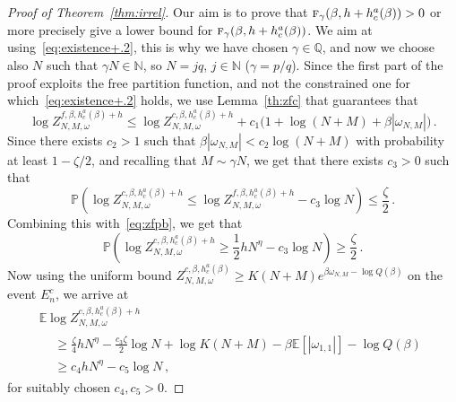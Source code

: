 \documentclass[10pt]{amsart}
\theoremstyle{definition}\newtheorem{defi}[theo]{Definition}\newtheorem{rema}[theo]{Remark}\newtheorem{exam}[theo]{Example}\newtheorem{exem}[theo]{Example}\newtheorem{nota}[theo]{Notation}
\newcommand{\tf}{\textsc{f}} %
\newcommand{\bbE}{\ensuremath{\mathbb{E}}}
\newcommand{\bbN}{\ensuremath{\mathbb{N}}}
\newcommand{\bbP}{\ensuremath{\mathbb{P}}}
\newcommand{\bbQ}{\ensuremath{\mathbb{Q}}}
\begin{document}
\begin{proof}[Proof of Theorem~\ref{thm:irrel}]
Our aim is to prove that $\tf_\gamma(\beta, h+ h_c^{a}(\beta)) >0$ or more precisely give a lower bound for $\tf_\gamma(\beta, h+ h_c^{a}(\beta))$. We aim at using~\eqref{eq:existence+.2}, this is why we have chosen $\gamma\in \bbQ$, and now we choose also $N$ such that $\gamma N \in \bbN$, so $N=jq$, $j\in \bbN$ ($\gamma=p/q$). Since the first part of the proof exploits the free partition function, and not the constrained one for which~\eqref{eq:existence+.2} holds, we use Lemma~\ref{th:zfc} that guarantees that
\begin{equation}\label{eq:zfc1}
\log Z^{f, \beta, h_c^a(\beta) +h}_{N,M,\omega} \le
\log Z^{c, \beta, h_c^a(\beta) +h}_{N,M,\omega} + c_1\big(1 + \log (N+M) + \beta | \omega_{N,M}| \big)\,.
\end{equation}
Since there exists $c_2 >1$ such that $\beta | \omega_{N,M}| < c_2 \log (N+M)$ with probability at least $1-\zeta/2$, and recalling that $M\sim \gamma N$, we get that there exists $c_3>0$ such that
\[
\bbP \left(\log Z^{c, \beta, h_c^a(\beta) +h}_{N,M,\omega} \le \log Z^{f, \beta, h_c^a(\beta) +h}_{N,M,\omega} - c_3 \log N \right) \leq \frac{\zeta}{2}\,.
\]
Combining this with~\eqref{eq:zfpb}, we get that
\begin{equation}\label{eq:hA}
\bbP \left(\log Z^{c, \beta, h_c^a(\beta) +h}_{N,M,\omega} \ge \frac{1}{2} h N^{ \eta} - c_3\log N \right) \ge \frac{\zeta}{2}
\,.
\end{equation}
Now using the uniform bound $Z^{c, \beta, h_c^a(\beta)}_{N,M,\omega} \ge K(N+M) e^{\beta \omega_{N,M} - \log Q(\beta) }$ on the event $E_n^c$, we arrive at
\begin{multline}\label{eq:irZ}
\bbE \log Z_{N,M,\omega}^{c,\beta,h_c^a(\beta)+h}\\
\begin{aligned}
& \ge \frac{\zeta}{4} h N^{\eta} - \frac{c_3\zeta}{2} \log N + \log K(N+M) - \beta \bbE [|\omega_{1,1}|] - \log Q(\beta) \\
& \ge c_4 h N^{\eta} - c_5\log N\,,
\end{aligned}
\end{multline}
for suitably chosen $c_4,c_5 >0$.




\end{proof}
\end{document}
